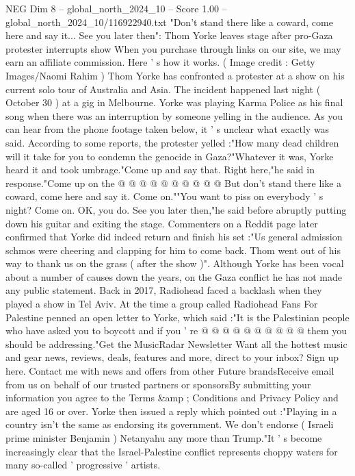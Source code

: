 \begin{textsample}{NEG Dim 8 – global\_north\_2024\_10 – Score 1.00 – global\_north\_2024\_10/116922940.txt}  \label{ex:f8_neg_207}
"Don't stand there like a coward, come here and say it...
See you later then": Thom Yorke leaves stage after pro-Gaza protester interrupts show When you purchase through links on our site, we may earn an affiliate commission.
Here ' s how it works. ( Image credit : Getty Images/Naomi Rahim ) Thom Yorke has confronted a protester at a show on his current solo tour of Australia and Asia.
The incident happened last night ( October 30 ) at a gig in Melbourne.
Yorke was playing Karma Police as his final song when there was an interruption by someone yelling in the audience.
As you can hear from the phone footage taken below, it ' s unclear what exactly was said.
According to some reports, the protester yelled :"How many dead children will it take for you to condemn the genocide in Gaza?"Whatever it was, Yorke heard it and took umbrage."Come up and say that.
Right here,"he said in response."Come up on the @ @ @ @ @ @ @ @ @ @ But don't stand there like a coward, come here and say it.
Come on.""You want to piss on everybody ' s night?
Come on.
OK, you do.
See you later then,"he said before abruptly putting down his guitar and exiting the stage.
Commenters on a Reddit page later confirmed that Yorke did indeed return and finish his set :"Us general admission schmos were cheering and clapping for him to come back.
Thom went out of his way to thank us on the grass ( after the show )".
Although Yorke has been vocal about a number of causes down the years, on the Gaza conflict he has not made any public statement.
Back in 2017, Radiohead faced a backlash when they played a show in Tel Aviv.
At the time a group called Radiohead Fans For Palestine penned an open letter to Yorke, which said :"It is the Palestinian people who have asked you to boycott and if you ' re @ @ @ @ @ @ @ @ @ @ them you should be addressing."Get the MusicRadar Newsletter Want all the hottest music and gear news, reviews, deals, features and more, direct to your inbox?
Sign up here.
Contact me with news and offers from other Future brandsReceive email from us on behalf of our trusted partners or sponsorsBy submitting your information you agree to the Terms \&amp ; Conditions and Privacy Policy and are aged 16 or over.
Yorke then issued a reply which pointed out :"Playing in a country isn't the same as endorsing its government.
We don't endorse ( Israeli prime minister Benjamin ) Netanyahu any more than Trump."It ' s become increasingly clear that the Israel-Palestine conflict represents choppy waters for many so-called ' progressive ' artists.

\end{textsample}
